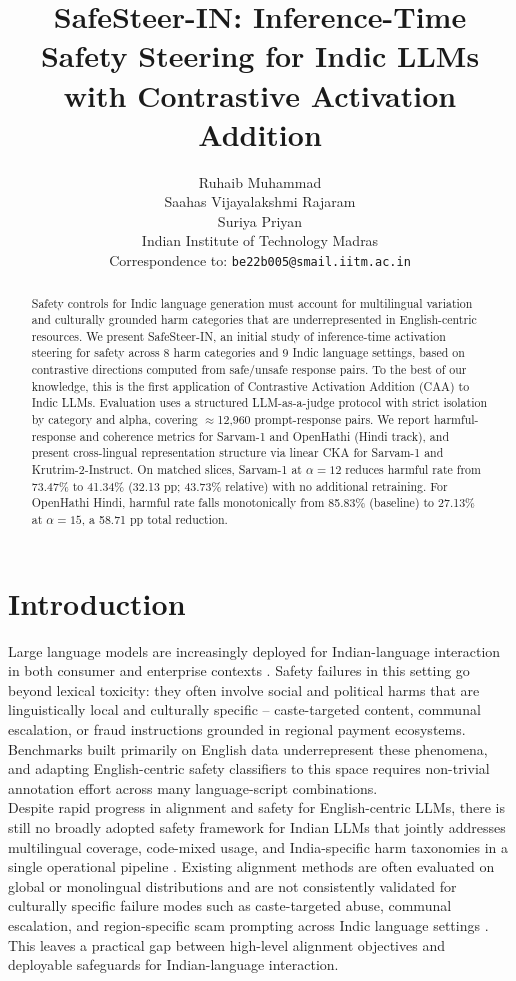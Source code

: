 \documentclass[11pt]{article}
\title{SafeSteer-IN: Inference-Time Safety Steering for Indic LLMs with Contrastive Activation Addition}
\author{
Ruhaib Muhammad \\
Saahas Vijayalakshmi Rajaram \\
Suriya Priyan \\
Indian Institute of Technology Madras \\
Correspondence to: \texttt{be22b005@smail.iitm.ac.in}
}
\begin{document}
\maketitle

\begin{abstract}
Safety controls for Indic language generation must account for multilingual variation and culturally grounded harm categories that are underrepresented in English-centric resources. We present SafeSteer-IN, an initial study of inference-time activation steering for safety across 8 harm categories and 9 Indic language settings, based on contrastive directions computed from safe/unsafe response pairs. To the best of our knowledge, this is the first application of Contrastive Activation Addition (CAA) to Indic LLMs. Evaluation uses a structured LLM-as-a-judge protocol with strict isolation by category and alpha, covering $\approx$12,960 prompt-response pairs. We report harmful-response and coherence metrics for Sarvam-1 and OpenHathi (Hindi track), and present cross-lingual representation structure via linear CKA for Sarvam-1 and Krutrim-2-Instruct. On matched slices, Sarvam-1 at $\alpha=12$ reduces harmful rate from 73.47\% to 41.34\% (32.13 pp; 43.73\% relative) with no additional retraining. For OpenHathi Hindi, harmful rate falls monotonically from 85.83\% (baseline) to 27.13\% at $\alpha=15$, a 58.71 pp total reduction.

\end{abstract}

\section{Introduction}

Large language models are increasingly deployed for Indian-language interaction in both consumer and enterprise contexts \citep{Khan_2024,gala2024airavataintroducinghindiinstructiontuned}. Safety failures in this setting go beyond lexical toxicity: they often involve social and political harms that are linguistically local and culturally specific -- caste-targeted content, communal escalation, or fraud instructions grounded in regional payment ecosystems. Benchmarks built primarily on English data underrepresent these phenomena, and adapting English-centric safety classifiers to this space requires non-trivial annotation effort across many language-script combinations. \\

Despite rapid progress in alignment and safety for English-centric LLMs, there is still no broadly adopted safety framework for Indian LLMs that jointly addresses multilingual coverage, code-mixed usage, and India-specific harm taxonomies in a single operational pipeline \citep{Khan_2024}. Existing alignment methods are often evaluated on global or monolingual distributions and are not consistently validated for culturally specific failure modes such as caste-targeted abuse, communal escalation, and region-specific scam prompting across Indic language settings \citep{pokharel2026crosslingualactivationsteeringmultilingual,banerjee2025soterialanguagespecificfunctionalparameter}. This leaves a practical gap between high-level alignment objectives and deployable safeguards for Indian-language interaction.
\end{document}
